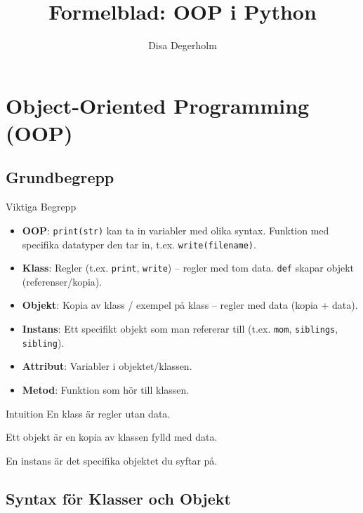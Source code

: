 \documentclass[10pt,a4paper]{report}
\title{\Huge Formelblad: OOP i Python}
\author{Disa Degerholm}
\date{}
\begin{document}
\maketitle

\tableofcontents

\chapter{Object-Oriented Programming (OOP)}

\section{Grundbegrepp}

\begin{conceptbox}{Viktiga Begrepp}
\begin{itemize}[leftmargin=*]
  \item \textbf{OOP}: \texttt{print(str)} kan ta in variabler med olika syntax. Funktion med specifika datatyper den tar in, t.ex. \texttt{write(filename)}.
  \item \textbf{Klass}: Regler (t.ex. \texttt{print}, \texttt{write}) -- regler med tom data. \texttt{def} skapar objekt (referenser/kopia).
  \item \textbf{Objekt}: Kopia av klass / exempel på klass -- regler med data (kopia + data).
  \item \textbf{Instans}: Ett specifikt objekt som man refererar till (t.ex. \texttt{mom}, \texttt{siblings}, \texttt{sibling}).
  \item \textbf{Attribut}: Variabler i objektet/klassen.
  \item \textbf{Metod}: Funktion som hör till klassen.
\end{itemize}
\end{conceptbox}

\begin{intuitionbox}{Intuition}
En klass är regler utan data.

Ett objekt är en kopia av klassen fylld med data.

En instans är det specifika objektet du syftar på.
\end{intuitionbox}

\section{Syntax för Klasser och Objekt}
\end{document}
